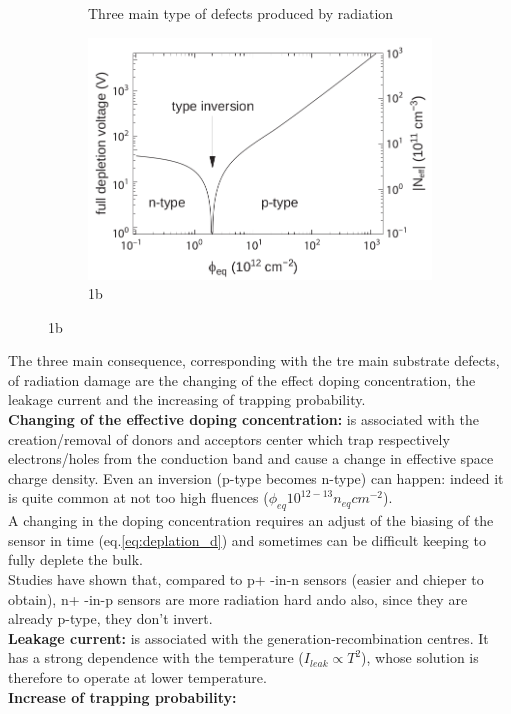 \begin{titlepage}
\begin{figure}
\begin{subfigure}{.5\textwidth}
     \caption{Three main type of defects produced by radiation}
     \label{fig:radiation_damage_scheme}
   \end{subfigure}%
   \begin{subfigure}{.5\textwidth}
     \centering
     \includegraphics[width=.8\linewidth]{figures/type_inversion.png}
     \caption{1b}
     \label{fig:type_inversion}
   \end{subfigure}
\end{figure}
The three main consequence, corresponding with the tre main substrate defects, of radiation damage are the changing of the effect doping concentration, the leakage current and the increasing of trapping probability.\\
\textbf{Changing of the effective doping concentration:} is associated with the creation/removal of donors and acceptors center which trap respectively electrons/holes from the conduction band and cause a change in effective space charge density. Even an inversion (p-type becomes n-type) can happen: indeed it is quite common at not too high fluences ($\phi_{eq} 10^{12-13}n_{eq}cm^{-2}$). \\
A changing in the doping concentration requires an adjust of the biasing of the sensor in time (eq.\ref{eq:deplation_d}) and sometimes can be difficult keeping to fully deplete the bulk.\\
Studies have shown that, compared to p+ -in-n sensors (easier and chieper to obtain), n+ -in-p sensors are more radiation hard ando also, since they are already p-type, they don't invert.\\
\textbf{Leakage current:} is associated with the generation-recombination centres. It has a strong dependence with the temperature ($I_{leak}\propto T^2$), whose solution is therefore to operate at lower temperature.\\
\textbf{Increase of trapping probability:}



\end{titlepage}
